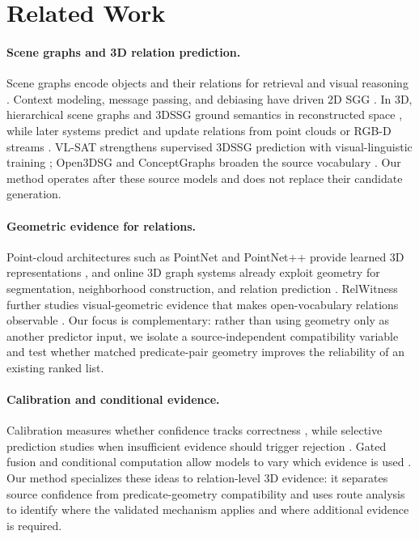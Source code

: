 \documentclass[letterpaper]{article} %
\begin{document}
\section{Related Work}

\paragraph{Scene graphs and 3D relation prediction.}
Scene graphs encode objects and their relations for retrieval and visual
reasoning \cite{johnson2015image,krishna2017visualgenome}. Context modeling,
message passing, and debiasing have driven 2D SGG
\cite{xu2017iterative,zellers2018neuralmotifs,yang2018graphrcnn,
tang2020unbiased}. In 3D, hierarchical scene graphs and 3DSSG ground semantics
in reconstructed space \cite{armeni2019scenegraph,wald2019rio,wald2020learning},
while later systems predict and update relations from point clouds or RGB-D
streams \cite{wu2021scenegraphfusion,wu2023rgbsgg,zhang2021knowledge3d}.
VL-SAT strengthens supervised 3DSSG prediction with visual-linguistic training
\cite{wang2023vlsat}; Open3DSG and ConceptGraphs broaden the source vocabulary
\cite{koch2024open3dsg,gu2024conceptgraphs}. Our method operates after these source
models and does not replace their candidate generation.

\paragraph{Geometric evidence for relations.}
Point-cloud architectures such as PointNet and PointNet++ provide learned 3D
representations \cite{qi2017pointnet,qi2017pointnetpp}, and online 3D graph
systems already exploit geometry for segmentation, neighborhood construction,
and relation prediction \cite{wu2021scenegraphfusion,hou2025fross}. RelWitness
further studies visual-geometric evidence that makes open-vocabulary relations
observable \cite{nguyen2026relwitness}. Our focus is complementary: rather than
using geometry only as another predictor input, we isolate a source-independent
compatibility variable and test whether matched predicate-pair geometry improves
the reliability of an existing ranked list.

\paragraph{Calibration and conditional evidence.}
Calibration measures whether confidence tracks correctness
\cite{guo2017calibration,nixon2019calibration}, while selective prediction
studies when insufficient evidence should trigger rejection
\cite{geifman2017selective,geifman2019selectivenet}. Gated fusion and conditional
computation allow models to vary which evidence is used
\cite{shazeer2017moe,perez2018film,arevalo2017gmu}. Our method specializes these ideas
to relation-level 3D evidence: it separates source confidence from
predicate-geometry compatibility and uses route analysis to identify where the
validated mechanism applies and where additional evidence is required.
\end{document}
